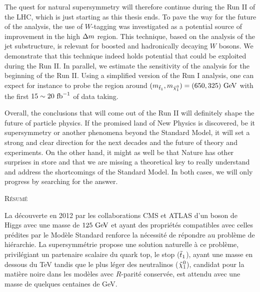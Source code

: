 The quest for natural supersymmetry will therefore continue during the Run II of the LHC,
which is just starting as this thesis ends. To pave the way for the future
of the analysis, the use of $W$-tagging was investigated as a potential source of improvement
in the high $\Delta m$ region. This technique, based on the analysis of the jet substructure, is
relevant for boosted and hadronically decaying $W$ bosons. We demonstrate that
this technique indeed holds potential that could be exploited during the Run II. In parallel,
 we estimate the sensitivity of the analysis for the beginning of the Run II. Using a
simplified version of the Run I analysis, one can expect for instance
to probe the region around $(m_{\tilde{t}_1},m_{\tilde{\chi}_1^0}) = (650,325)~\text{GeV}$
with the first $15\sim20~\text{fb}^{-1}$ of data taking.

Overall, the conclusions that will come out of the Run II will definitely shape the future
of particle physics. If the promised land of New Physics is discovered, be it supersymmetry
or another phenomena beyond the Standard Model, it will set a strong and clear direction
for the next decades and the future of theory and experiments. On the other hand, it might
as well be that Nature has other surprises in store and that we are missing a theoretical
key to really understand and address the shortcomings of the Standard Model. In both
cases, we will only progress by searching for the answer.

\emptypage


\renewcommand{\leftmark}{Bibliography}

\begin{thebibliography}{2}

\singlespace



\end{thebibliography}

\newpage
\thispagestyle{empty}
\singlespace
\begin{center}\textsc{Résumé}\end{center}
    \vspace*{-0.2cm}
    La découverte en 2012 par les collaborations CMS et ATLAS d'un boson de Higgs avec une
masse de $125~\text{GeV}$ et ayant des propriétés compatibles avec celles prédites par le
Modèle Standard renforce la nécessité de répondre au problème de hiérarchie. La
supersymmétrie propose une solution naturelle à ce problème, privilégiant un
partenaire scalaire du quark top, le stop ($\tilde{t}_1$), ayant une masse en dessous du
TeV tandis que le plus léger des neutralinos ($\tilde{\chi}_1^0$), candidat pour
la matière noire dans les modèles avec $R$-parité conservée, est attendu avec une masse
de quelques centaines de GeV.

